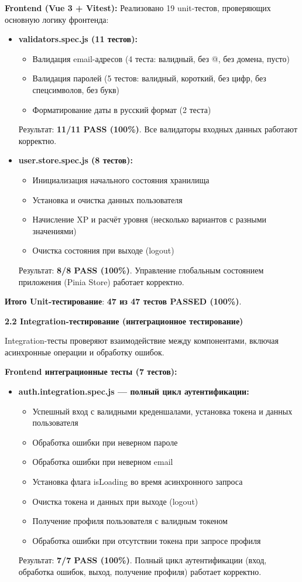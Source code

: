\textbf{Frontend (Vue 3 + Vitest):} Реализовано 19 unit-тестов, проверяющих основную логику фронтенда:

\begin{itemize}
	\item \textbf{validators.spec.js (11 тестов):}
	\begin{itemize}
		\item Валидация email-адресов (4 теста: валидный, без @, без домена, пусто)
		\item Валидация паролей (5 тестов: валидный, короткий, без цифр, без спецсимволов, без букв)
		\item Форматирование даты в русский формат (2 теста)
	\end{itemize}
	Результат: \textbf{11/11 PASS (100\%)}. Все валидаторы входных данных работают корректно.
	
	\item \textbf{user.store.spec.js (8 тестов):}
	\begin{itemize}
		\item Инициализация начального состояния хранилища
		\item Установка и очистка данных пользователя
		\item Начисление XP и расчёт уровня (несколько вариантов с разными значениями)
		\item Очистка состояния при выходе (logout)
	\end{itemize}
	Результат: \textbf{8/8 PASS (100\%)}. Управление глобальным состоянием приложения (Pinia Store) работает корректно.
\end{itemize}

\textbf{Итого Unit-тестирование}: \textbf{47 из 47 тестов PASSED (100\%)}.

\textbf{2.2 Integration-тестирование (интеграционное тестирование)}

Integration-тесты проверяют взаимодействие между компонентами, включая асинхронные операции и обработку ошибок.

\textbf{Frontend интеграционные тесты (7 тестов):}

\begin{itemize}
	\item \textbf{auth.integration.spec.js --- полный цикл аутентификации:}
	\begin{itemize}
		\item Успешный вход с валидными креденшалами, установка токена и данных пользователя
		\item Обработка ошибки при неверном пароле
		\item Обработка ошибки при неверном email
		\item Установка флага isLoading во время асинхронного запроса
		\item Очистка токена и данных при выходе (logout)
		\item Получение профиля пользователя с валидным токеном
		\item Обработка ошибки при отсутствии токена при запросе профиля
	\end{itemize}
	Результат: \textbf{7/7 PASS (100\%)}. Полный цикл аутентификации (вход, обработка ошибок, выход, получение профиля) работает корректно.
\end{itemize}

